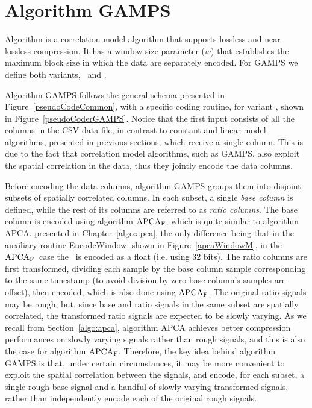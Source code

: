
\clearpage

\section{Algorithm GAMPS}
\label{algo:gamps}
\newcommand{\apcaF}{$\textnormal{APCA}_\textnormal{F}$}


\vspace{-5pt}
Algorithm \textit{\GAMPSfull} \cite{coder:gamps} is a correlation model algorithm that supports lossless and near-lossless compression. It has a window size parameter ($w$) that establishes the maximum block size in which the data are separately encoded. For GAMPS we define both variants, \maskalgo\ and \NOmaskalgo.


Algorithm GAMPS follows the general schema presented in Figure~\ref{pseudoCodeCommon}, with a specific coding routine, for variant \maskalgo, shown in Figure~\ref{pseudoCoderGAMPS}. Notice that the first input consists of all the columns in the CSV data file, in contrast to constant and linear model algorithms, presented in previous sections, which receive a single column. This is due to the fact that correlation model algorithms, such as GAMPS, also exploit the spatial correlation in the data, thus they jointly encode the data columns. 


Before encoding the data columns, algorithm GAMPS groups them into disjoint subsets of spatially correlated columns. In each subset, a single \textit{base column} is defined, while the rest of its columns are referred to as \textit{ratio columns}. The base column is encoded using algorithm \apcaF, which is quite similar to algorithm APCA. presented in Chapter~\ref{algo:apca}, the only difference being that in the auxiliary routine EncodeWindow, shown in Figure~\ref{apcaWindowM}, in the \apcaF\ case the \midrange\ is encoded as a float (i.e. using 32 bits). The ratio columns are first transformed, dividing each sample by the base column sample corresponding to the same timestamp (to avoid division by zero base column's samples are offset), then encoded, which is also done using \apcaF. The original ratio signals may be rough, but, since base and ratio signals in the same subset are spatially correlated, the transformed ratio signals are expected to be slowly varying. As we recall from Section~\ref{algo:apca}, algorithm APCA achieves better compression performances on slowly varying signals rather than rough signals, and this is also the case for algorithm \apcaF. Therefore, the key idea behind algorithm GAMPS is that, under certain circumstances, it may be more convenient to exploit the spatial correlation between the signals, and encode, for each subset, a single rough base signal and a handful of slowly varying transformed signals, rather than independently encode each of the original rough signals.



